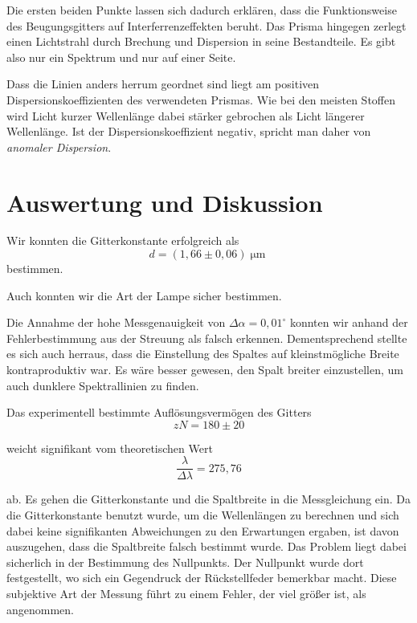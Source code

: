 \documentclass[a4paper,german,12pt,smallheadings]{scrartcl}
\begin{document}
Die ersten beiden Punkte lassen sich dadurch erklären, dass die Funktionsweise
des Beugungsgitters auf Interferrenzeffekten beruht. Das Prisma hingegen
zerlegt einen Lichtstrahl durch Brechung und Dispersion in seine Bestandteile.
Es gibt also nur ein Spektrum und nur auf einer Seite.

Dass die Linien anders herrum geordnet sind liegt am positiven
Dispersionskoeffizienten des verwendeten Prismas. Wie bei den meisten Stoffen
wird Licht kurzer Wellenlänge dabei stärker gebrochen als Licht längerer
Wellenlänge. Ist der Dispersionskoeffizient negativ, spricht man daher von
\textit{anomaler Dispersion}.

\section{Auswertung und Diskussion}

Wir konnten die Gitterkonstante erfolgreich als
\begin{equation*}
  d = (1{,}66\pm0{,}06) \operatorname{\mu m}
\end{equation*}
bestimmen.

Auch konnten wir die Art der Lampe sicher bestimmen.

Die Annahme der hohe Messgenauigkeit von $\Delta \alpha = 0{,}01^\circ$ konnten
wir anhand der Fehlerbestimmung aus der Streuung als falsch erkennen.
Dementsprechend stellte es sich auch herraus, dass die Einstellung des Spaltes
auf kleinstmögliche Breite kontraproduktiv war. Es wäre besser gewesen, den
Spalt breiter einzustellen, um auch dunklere Spektrallinien zu finden.

Das experimentell bestimmte Auflösungsvermögen des Gitters
\begin{equation}
  z N = 180\pm20
\end{equation}

weicht signifikant vom theoretischen Wert
\begin{equation}
  \frac{\lambda}{\Delta \lambda} = 275{,}76
\end{equation}

ab. Es gehen die Gitterkonstante und die Spaltbreite in die Messgleichung ein.
Da die Gitterkonstante benutzt wurde, um die Wellenlängen zu berechnen und sich
dabei keine signifikanten Abweichungen zu den Erwartungen ergaben, ist davon
auszugehen, dass die Spaltbreite falsch bestimmt wurde. Das Problem liegt dabei
sicherlich in der Bestimmung des Nullpunkts. Der Nullpunkt wurde dort
festgestellt, wo sich ein Gegendruck der Rückstellfeder bemerkbar macht.  Diese
subjektive Art der Messung führt zu einem Fehler, der viel größer ist, als
angenommen.
\end{document}
